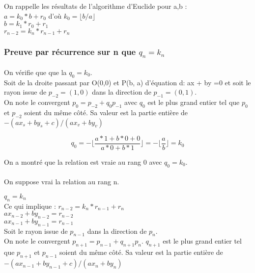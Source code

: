 On rappelle les résultats de l'algorithme d'Euclide pour a,b : \\
\noindent $a       = k_0*b       + r_0$ d'où $k_0 = \lfloor b / a \rfloor$\\
\noindent $b       = k_1*r_0     + r_1$\\
\noindent $r_{n-2} = k_n*r_{n-1} + r_{n}$\\

\subsubsection{Preuve par récurrence sur n que $q_n = k_n$}

\paragraph{}

On vérifie que que la $q_0 = k_0$.\\

Soit de la droite passant par O(0,0) et P(b, a) d'équation d: ax + by =0 et soit le rayon issue de $p_{-2} = (1,0)$ dans la direction de $p_{-1} = (0,1)$.\\

On note le convergent $p_{0} = p_{-2} + q_0 p_{-1}$ avec $q_0$ est le plus grand entier tel que $p_0$ et $p_{-2}$ soient du même côté. Sa valeur est la partie entière de $-(a x_s + b y_s +c)/(a x_v + b y_v)$

$$q_0 = - \lfloor\frac{a*1 + b*0 +0}{a*0 + b*1}\rfloor = - \lfloor\frac{a}{b}\rfloor = k_0$$

On a montré que la relation est vraie au rang 0 avec \textbf{$q_0 = k_0$}.

\paragraph{}
On suppose vrai la relation au rang n.

$q_n = k_n$\\

Ce qui implique :  
$r_{n-2} = k_n*r_{n-1} + r_{n}$\\
$a x_{n-2} + b y_{n-2} = r_{n-2}$\\
$a x_{n-1} + b y_{n-1} = r_{n-1}$\\

Soit le rayon issue de $p_{n-1}$ dans la direction de $p_{n}$.\\
On note le convergent $p_{n+1} = p_{n-1} + q_{n+1} p_{n}$. $q_{n+1}$ est le plus grand entier tel que $p_{n+1}$ et $p_{n-1}$ soient du même côté. Sa valeur est la partie entière de $-(a x_{n-1} + b y_{n-1} +c)/(a x_{n} + b y_{n})$


